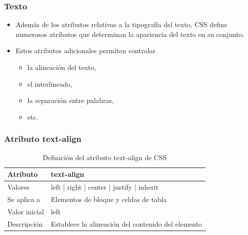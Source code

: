 \documentclass[ucs]{beamer}
\begin{document}

\begin{frame}
\frametitle{Texto}

\begin{itemize}
  \item Además de los atributos relativas a la tipografía del texto, CSS define numerosos atributos que determinan la apariencia del texto en su conjunto.
  \item Estos atributos adicionales permiten controlar
  \begin{itemize}
    \item la alineación del texto,
    \item el interlineado,
    \item la separación entre palabras,
    \item etc.
  \end{itemize}
\end{itemize}

\end{frame}



\begin{frame}
\frametitle{Atributo text-align}

\begin{center}
  \begin{table}
   \begin{tabular}{p{1.8cm}p{7.8cm}}
Atributo & \bf{text-align} \\ \hline
Valores& left | right | center | justify | inherit \\ \hline
Se aplica a& Elementos de bloque y celdas de tabla \\ \hline
Valor inicial& left \\ \hline
Descripción& Establece la alineación del contenido del elemento \\ \hline
  \end{tabular}
   \caption{Definición del atributo text-align de CSS}
 \end{table}
\end{center}


\end{frame}


\end{document}
